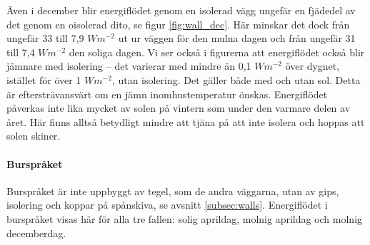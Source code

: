 Även i december blir energiflödet genom en isolerad vägg ungefär en fjädedel av det 
genom en oisolerad dito, se figur \ref{fig:wall_dec}. Här minskar det dock från ungefär 33 
till 7,9 $\unit{W m^{-2}}$ ut ur väggen för den mulna dagen och från ungefär 31 till 7,4 $\unit{W m^{-2}}$ den soliga dagen. Vi ser också i figurerna att energiflödet också blir 
jämnare med isolering – det varierar med mindre än 0,1 $\unit{W m^{-2}}$ över dygnet, 
istället för över 1 $\unit{W m^{-2}}$, utan isolering. Det gäller både med och utan sol. Detta är eftersträvansvärt om en jämn inomhustemperatur önskas. Energiflödet påverkas inte lika mycket av solen på vintern som under den varmare delen av året. Här finns alltså betydligt mindre att tjäna på att inte isolera och hoppas att solen skiner.

\paragraph{Burspråket}

Burspråket är inte uppbyggt av tegel, som de andra väggarna, utan av gips, isolering och koppar på spånskiva, se avsnitt \ref{subsec:walls}. Energiflödet i burspråket visas här för alla tre fallen: solig aprildag, molnig aprildag och molnig decemberdag.

